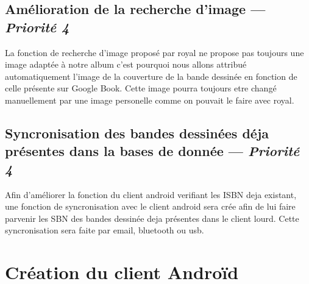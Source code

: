 \subsection[Amélioration de la recherche d'image]{Amélioration de la recherche d'image — \emph{Priorité 4}}
La fonction de recherche d'image proposé par royal ne propose pas toujours une image adaptée à notre album c'est pourquoi nous allons attribué automatiquement l'image de la couverture de la bande dessinée en fonction de celle présente sur Google Book. Cette image pourra toujours etre changé manuellement par une image personelle comme on pouvait le faire avec royal.

\subsection[Syncronisation des bandes dessinées déja présentes dans la bases de donnée]{Syncronisation des bandes dessinées déja présentes dans la bases de donnée — \emph{Priorité 4}}
Afin d'améliorer la fonction du client android verifiant les ISBN deja existant, une fonction de syncronisation avec le client android sera crée afin de lui faire parvenir les SBN des bandes dessinée deja présentes dans le client lourd. Cette syncronisation sera faite par email, bluetooth ou usb.

\section{Création du client Androïd}





